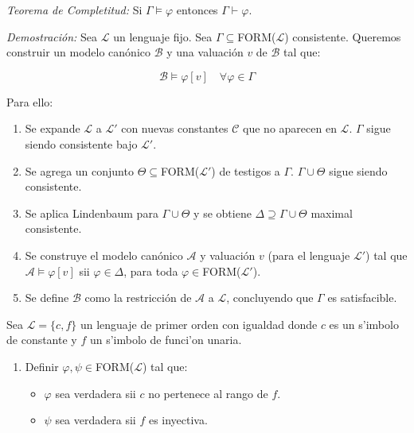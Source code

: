 \begin{questions}
\begin{solution}
 {\it Teorema de Completitud: } Si $\Gamma\vDash\varphi$ entonces $\Gamma\vdash\varphi$.
 
 {\it Demostraci\'on: } Sea $\mathcal{L}$ un lenguaje fijo. Sea $\Gamma\subseteq$FORM($\mathcal{L}$) consistente. Queremos construir un modelo can\'onico $\mathcal{B}$ y una valuaci\'on $v$ de $\mathcal{B}$ tal que: 
 
 \begin{equation*}
  \mathcal{B}\vDash\varphi[v] \quad\forall\varphi\in\Gamma
 \end{equation*}

 Para ello: 
 \begin{enumerate}
  \item Se expande $\mathcal{L}$ a $\mathcal{L}'$ con nuevas constantes $\mathcal{C}$ que no aparecen en $\mathcal{L}$. $\Gamma$ sigue siendo consistente bajo $\mathcal{L}'$. 
  \item Se agrega un conjunto $\Theta\subseteq$FORM($\mathcal{L}'$) de testigos a $\Gamma$. $\Gamma\cup\Theta$ sigue siendo consistente. 
  \item Se aplica Lindenbaum para $\Gamma\cup\Theta$ y se obtiene $\Delta\supseteq\Gamma\cup\Theta$ maximal consistente.
  \item Se construye el modelo can\'onico $\mathcal{A}$ y valuaci\'on $v$ (para el lenguaje $\mathcal{L}'$) tal que $\mathcal{A}\vDash\varphi[v]$ sii $\varphi\in\Delta$, para toda $\varphi\in$FORM($\mathcal{L}'$).
  \item Se define $\mathcal{B}$ como la restricci\'on de $\mathcal{A}$ a $\mathcal{L}$, concluyendo que $\Gamma$ es satisfacible. 
 \end{enumerate}

\end{solution}

\question Sea $\mathcal{L} = \{c, f\}$ un lenguaje de primer orden con igualdad donde $c$ es un s'imbolo de constante y $f$ un s'imbolo de funci'on unaria. 

\begin{enumerate}
 \item Definir $\varphi, \psi \in $FORM($\mathcal{L}$) tal que: 
 
 \begin{itemize}
  \item $\varphi$ sea verdadera sii $c$ no pertenece al rango de $f$. 
  \item $\psi$ sea verdadera sii $f$ es inyectiva. 
 \end{itemize}


\end{enumerate}
\end{questions}
